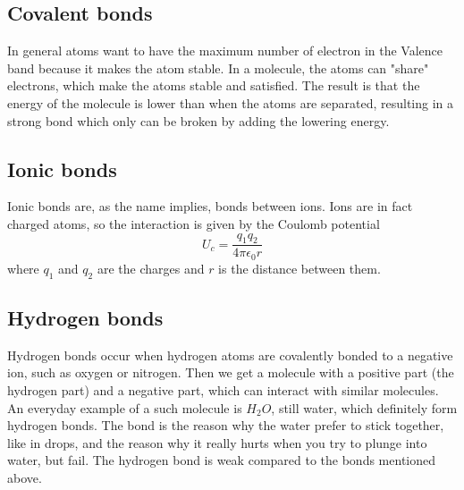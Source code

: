 \documentclass[norsk,a4paper,12pt]{article}
\begin{document}
\subsection*{Covalent bonds}
In general atoms want to have the maximum number of electron in the Valence band because it makes the atom stable. In a molecule, the atoms can "share" electrons, which make the atoms stable and satisfied. The result is that the energy of the molecule is lower than when the atoms are separated, resulting in a strong bond which only can be broken by adding the lowering energy. 

\subsection*{Ionic bonds}
Ionic bonds are, as the name implies, bonds between ions. Ions are in fact charged atoms, so the interaction is given by the Coulomb potential
\begin{equation}
U_c=\frac{q_1q_2}{4\pi\epsilon_0r}
\end{equation}
where $q_1$ and $q_2$ are the charges and $r$ is the distance between them.

\subsection*{Hydrogen bonds}
Hydrogen bonds occur when hydrogen atoms are covalently bonded to a negative ion, such as oxygen or nitrogen. Then we get a molecule with a positive part (the hydrogen part) and a negative part, which can interact with similar molecules. An everyday example of a such molecule is $H_2O$, still water, which definitely form hydrogen bonds. The bond is the reason why the water prefer to stick together, like in drops, and the reason why it really hurts when you try to plunge into water, but fail. The hydrogen bond is weak compared to the bonds mentioned above.
\end{document}
